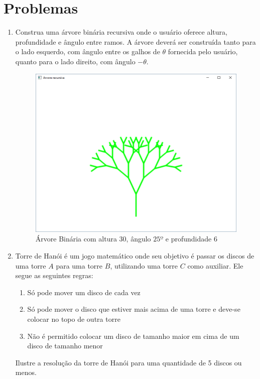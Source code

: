 \section*{Problemas}
\begin{enumerate}

\item
  Construa uma árvore binária recursiva onde o usuário oferece altura, profundidade e ângulo entre ramos. A árvore deverá ser construída tanto para o lado esquerdo, com ângulo entre os galhos de $\theta$ fornecida pelo usuário, quanto para o lado direito, com ângulo $-\theta$.
  \label{ex:cap04_ex2}

  \begin{figure}[H]
    \centerline{\includegraphics[width=.5\textwidth]{img/cap4_ex17.png}}
    \caption{Árvore Binária com altura $30$, ângulo $25º$ e profundidade $6$}
    \label{fig:cap04_ex2}
  \end{figure}

\item
  Torre de Hanói é um jogo matemático onde seu objetivo é passar os discos de uma torre $A$ para uma torre $B$, utilizando uma torre $C$ como auxiliar. Ele segue as seguintes regras:
  \begin{enumerate}
    \item Só pode mover um disco de cada vez
    \item Só pode mover o disco que estiver mais acima de uma torre e deve-se colocar no topo de outra torre
    \item Não é permitido colocar um disco de tamanho maior em cima de um disco de tamanho menor
  \end{enumerate}

  Ilustre a resolução da torre de Hanói para uma quantidade de 5 discos ou menos.
  \label{ex:cap04_ex1}


\end{enumerate}
